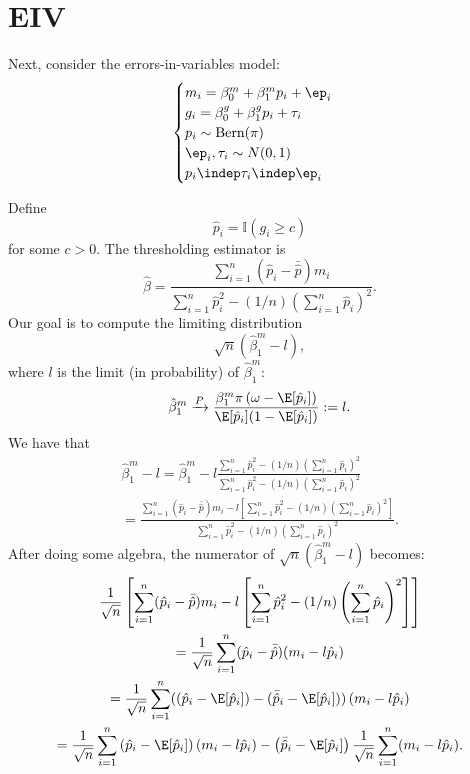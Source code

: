 \documentclass[12pt]{article}
\begin{document}
\section{EIV}

Next, consider the errors-in-variables model:
$$
\begin{cases}
m_i = \beta^m_0 + \beta^m_1 p_i + \ep_i \\
g_i = \beta^g_0 + \beta^g_1 p_i + \tau_i \\
p_i \sim \textrm{Bern}(\pi) \\
\ep_i, \tau_i \sim N(0,1) \\
p_i \indep \tau_i \indep \ep_i
\end{cases}
$$

Define $$\hat{p}_i = \mathbb{I}\left( g_i \geq c \right)$$ for some $c > 0$. The thresholding estimator is
$$\hat{\beta} = \frac{\sum_{i=1}^n (\hat{p}_i - \bar{\hat{p}})m_i }{\sum_{i=1}^n \hat{p}_i^2 - (1/n) \left( \sum_{i=1}^n \hat{p}_i \right)^2}.$$
Our goal is to compute the limiting distribution
$$ \sqrt{n} \left(\hat{\beta}^m_1 - l \right),$$ where $l$ is the limit (in probability) of $\hat{\beta}^m_1$:
$$\hat{\beta}^m_1 \xrightarrow{P} \frac{\beta^m_1 \pi \left(\omega - \E[\hat{p}_i ]\right)}{\E[\hat{p}_i ](1 - \E[\hat{p}_i])} := l.$$
We have that
\begin{multline*}
\hat{\beta}^m_1 -  l = \hat{\beta}^m_1 - l \frac{\sum_{i=1}^n \hat{p}_i^2 - (1/n) \left( \sum_{i=1}^n \hat{p}_i \right)^2}{ \sum_{i=1}^n \hat{p}_i^2 - (1/n) \left( \sum_{i=1}^n \hat{p}_i \right)^2} \\ = \frac{\sum_{i=1}^n (\hat{p}_i - \bar{\hat{p}})m_i - l \left[ \sum_{i=1}^n \hat{p}_i^2 - (1/n) \left( \sum_{i=1}^n \hat{p}_i \right)^2 \right] }{\sum_{i=1}^n \hat{p}_i^2 - (1/n) \left( \sum_{i=1}^n \hat{p}_i \right)^2}.
\end{multline*}
After doing some algebra, the numerator of $\sqrt{n}( \hat{\beta}^m_1 - l )$ becomes:
\begin{multline}\label{limit_1}
\frac{1}{\sqrt{n}} \left[\sum_{i=1}^n (\hat{p}_i - \bar{\hat{p}})m_i - l \left[ \sum_{i=1}^n \hat{p}_i^2 - (1/n) \left( \sum_{i=1}^n \hat{p}_i \right)^2 \right] \right] \\ = \frac{1}{\sqrt{n}} \sum_{i=1}^n (\hat{p}_i - \bar{\hat{p}})(m_i - l \hat{p}_i) \\ = \frac{1}{\sqrt{n}} \sum_{i=1}^n ((\hat{p}_i - \E[\hat{p}_i]) - (\bar{\hat{p}}_i - \E[ \hat{p}_i]))\left( m_i - l \hat{p}_i \right) \\ = \frac{1}{\sqrt{n}} \sum_{i=1}^n \left( \hat{p}_i - \E[\hat{p}_i] \right) (m_i - l \hat{p}_i) - \left(\bar{\hat{p}}_i - \E[ \hat{p}_i ] \right) \frac{1}{\sqrt{n}}\sum_{i=1}^n (m_i - l \hat{p}_i).
\end{multline}
\end{document}

